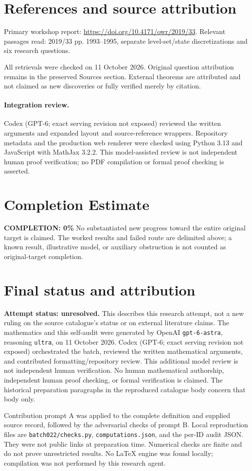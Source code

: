 \documentclass[11pt]{article}
\begin{document}
\section{References and source attribution}
Primary workshop report: \url{https://doi.org/10.4171/owr/2019/33}. Relevant passages read: 2019/33 pp. 1993--1995, separate level-set/state discretizations and six research questions.

All retrievals were checked on 11 October 2026. Original question attribution remains in the preserved Sources section. External theorems are attributed and not claimed as new discoveries or fully verified merely by citation.


\paragraph{Integration review.} Codex (GPT-6; exact serving revision not exposed) reviewed the written arguments and expanded layout and source-reference wrappers. Repository metadata and the production web renderer were checked using Python 3.13 and JavaScript with MathJax 3.2.2. This model-assisted review is not independent human proof verification; no PDF compilation or formal proof checking is asserted.

\section{Completion Estimate}
\noindent\textbf{COMPLETION: 0\%}
No substantiated new progress toward the entire original target is claimed. The worked results and failed route are delimited above; a known result, illustrative model, or auxiliary obstruction is not counted as original-target completion.

\section{Final status and attribution}
\textbf{Attempt status: unresolved.} This describes this research attempt, not a new ruling on the source catalogue's status or on external literature claims.
The mathematics and this self-audit were generated by OpenAI \texttt{gpt-6-astra}, reasoning \texttt{ultra}, on 11 October 2026. Codex (GPT-6; exact serving revision not exposed) orchestrated the batch, reviewed the written mathematical arguments, and contributed formatting/repository review. This additional model review is not independent human verification. No human mathematical authorship, independent human proof checking, or formal verification is claimed. The historical preparation paragraphs in the reproduced catalogue body concern that body only.

Contribution prompt A was applied to the complete definition and supplied source record, followed by the adversarial checks of prompt B. Local reproduction files are \texttt{batch022/checks.py}, \texttt{computations.json}, and the per-ID audit JSON. They were not public links at preparation time. Numerical checks are finite and do not prove unrestricted results. No LaTeX engine was found locally; compilation was not performed by this research agent.
\end{document}
